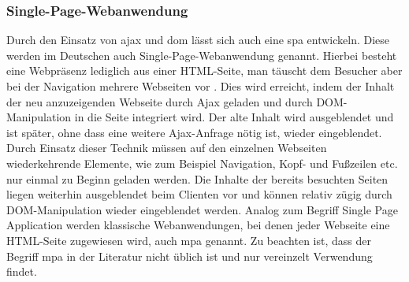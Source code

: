 \subsubsection{Single-Page-Webanwendung}
\label{sec:spa}

Durch den Einsatz von \ac{ajax} und \ac{dom} lässt sich auch eine \acf{spa} entwickeln. Diese werden im Deutschen auch Single-Page-Webanwendung genannt. Hierbei besteht eine Webpräsenz lediglich aus einer HTML-Seite, man täuscht dem Besucher aber bei der Navigation mehrere Webseiten vor \cite[S. 32]{ste15}. Dies wird erreicht, indem der Inhalt der neu anzuzeigenden Webseite durch Ajax geladen und durch DOM-Manipulation in die Seite integriert wird. Der alte Inhalt wird ausgeblendet und ist später, ohne dass eine weitere Ajax-Anfrage nötig ist, wieder eingeblendet. Durch Einsatz dieser Technik müssen auf den einzelnen Webseiten wiederkehrende Elemente, wie zum Beispiel Navigation, Kopf- und Fußzeilen etc. nur einmal zu Beginn geladen werden. Die Inhalte der bereits besuchten Seiten liegen weiterhin ausgeblendet beim Clienten vor und können relativ zügig durch DOM-Manipulation wieder eingeblendet werden. Analog zum Begriff Single Page Application werden klassische Webanwendungen, bei denen jeder Webseite eine HTML-Seite zugewiesen wird, auch \ac{mpa} genannt. Zu beachten ist, dass der Begriff \ac{mpa} in der Literatur nicht üblich ist und nur vereinzelt Verwendung findet. 